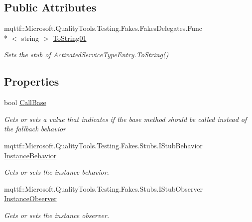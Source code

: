 \subsection*{Public Attributes}
\begin{DoxyCompactItemize}
\item 
mqttf\-::\-Microsoft.\-Quality\-Tools.\-Testing.\-Fakes.\-Fakes\-Delegates.\-Func\\*
$<$ string $>$ \hyperlink{class_system_1_1_runtime_1_1_remoting_1_1_fakes_1_1_stub_activated_service_type_entry_afa8b457c75dc944f189793d97d99b3f7}{To\-String01}
\begin{DoxyCompactList}\small\item\em Sets the stub of Activated\-Service\-Type\-Entry.\-To\-String()\end{DoxyCompactList}\end{DoxyCompactItemize}
\subsection*{Properties}
\begin{DoxyCompactItemize}
\item 
bool \hyperlink{class_system_1_1_runtime_1_1_remoting_1_1_fakes_1_1_stub_activated_service_type_entry_a3ba273ada642bf7ddf99ca4256edc72a}{Call\-Base}
\begin{DoxyCompactList}\small\item\em Gets or sets a value that indicates if the base method should be called instead of the fallback behavior\end{DoxyCompactList}\item 
mqttf\-::\-Microsoft.\-Quality\-Tools.\-Testing.\-Fakes.\-Stubs.\-I\-Stub\-Behavior \hyperlink{class_system_1_1_runtime_1_1_remoting_1_1_fakes_1_1_stub_activated_service_type_entry_ab44fbc738ebf22b5c34a3d08df25287a}{Instance\-Behavior}
\begin{DoxyCompactList}\small\item\em Gets or sets the instance behavior.\end{DoxyCompactList}\item 
mqttf\-::\-Microsoft.\-Quality\-Tools.\-Testing.\-Fakes.\-Stubs.\-I\-Stub\-Observer \hyperlink{class_system_1_1_runtime_1_1_remoting_1_1_fakes_1_1_stub_activated_service_type_entry_ae4ff04e5f5157bcdf58d7d18be0c408c}{Instance\-Observer}
\begin{DoxyCompactList}\small\item\em Gets or sets the instance observer.\end{DoxyCompactList}\end{DoxyCompactItemize}


